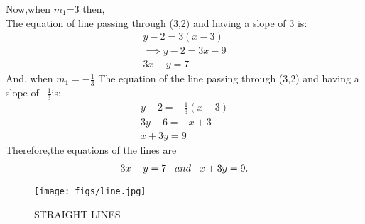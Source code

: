 \documentclass{article}
\begin{document}
Now,when $m_1$=3 then,\\
The equation of line passing through (3,2) and having a slope of 3 is:
\begin{align}
    y-2=3(x-3)\\
    \implies y-2=3x-9\\
    3x-y=7
\end{align}
And, when $m_1=-\frac{1}{3}$
The equation of the line passing through (3,2) and having a slope of$ -\frac{1}{3}$is:
\begin{align}
    y-2=-\frac{1}{3}(x-3)\\
    3y-6=-x+3\\
    x+3y=9
\end{align}
Therefore,the equations of the lines are 
\begin{align}
    3x-y=7 \hspace{0.3cm}and\hspace{0.3cm} x+3y=9.
\end{align}
\begin{figure}[H]
\centering
\texttt{[image: figs/line.jpg]}
\caption{STRAIGHT LINES}
\label{fig:line.jpg}
\end{figure}
\end{document}
